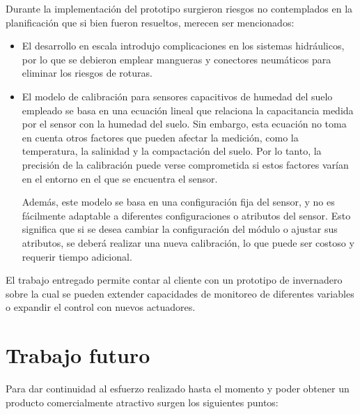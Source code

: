Durante la implementación del prototipo surgieron riesgos no contemplados en la planificación que si bien fueron resueltos, merecen ser mencionados:
\begin{itemize}
\item El desarrollo en escala introdujo complicaciones en los sistemas hidráulicos, por lo que se debieron emplear mangueras y conectores neumáticos para eliminar los riesgos de roturas.

\item El modelo de calibración para sensores capacitivos de humedad del suelo empleado \citep{soilcalibration} se basa en una ecuación lineal que relaciona la capacitancia medida por el sensor con la humedad del suelo. Sin embargo, esta ecuación no toma en cuenta otros factores que pueden afectar la medición, como la temperatura, la salinidad y la compactación del suelo. Por lo tanto, la precisión de la calibración puede verse comprometida si estos factores varían en el entorno en el que se encuentra el sensor.

Además, este modelo se basa en una configuración fija del sensor, y no es fácilmente adaptable a diferentes configuraciones o atributos del sensor. Esto significa que si se desea cambiar la configuración del módulo o ajustar sus atributos, se deberá realizar una nueva calibración, lo que puede ser costoso y requerir tiempo adicional.
\end{itemize}


El trabajo entregado permite contar al cliente con un prototipo de invernadero sobre la cual se pueden extender capacidades de monitoreo de diferentes variables o expandir el control con nuevos actuadores.







\section{Trabajo futuro}

Para dar continuidad al esfuerzo realizado hasta el momento y poder obtener un
producto comercialmente atractivo surgen los siguientes puntos:

